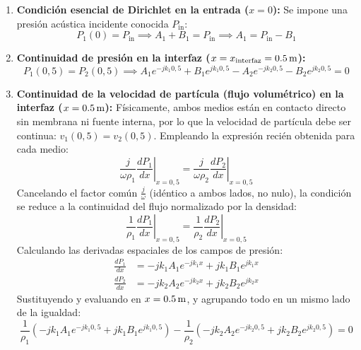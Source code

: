 \documentclass[11pt,letterpaper]{article}
\begin{document}
\begin{enumerate}
    \item \textbf{Condición esencial de Dirichlet en la entrada ($x = 0$):}
    Se impone una presión acústica incidente conocida $P_{\text{in}}$:
    \begin{equation}
        P_1(0) = P_{\text{in}} \implies A_1 + B_1 = P_{\text{in}} \implies A_1 = P_{\text{in}} - B_1
    \end{equation}

    \item \textbf{Continuidad de presión en la interfaz ($x = x_{\text{interfaz}} = \text{\qty{0,5}{\metre}}$):}
    \begin{equation}
        P_1(0{,}5) = P_2(0{,}5) \implies A_1 e^{-j k_1 0{,}5} + B_1 e^{j k_1 0{,}5} - A_2 e^{-j k_2 0{,}5} - B_2 e^{j k_2 0{,}5} = 0
    \end{equation}

    \item \textbf{Continuidad de la velocidad de partícula (flujo volumétrico) en la interfaz ($x = \text{\qty{0,5}{\metre}}$):}
    Físicamente, ambos medios están en contacto directo sin membrana ni fuente interna, por lo que la velocidad de partícula debe ser continua: $v_1(0{,}5) = v_2(0{,}5)$. Empleando la expresión recién obtenida para cada medio:
    \begin{equation}
        \frac{j}{\omega \rho_1} \left. \frac{dP_1}{dx} \right|_{x=0{,}5} = \frac{j}{\omega \rho_2} \left. \frac{dP_2}{dx} \right|_{x=0{,}5}
    \end{equation}
    Cancelando el factor común $\frac{j}{\omega}$ (idéntico a ambos lados, no nulo), la condición se reduce a la continuidad del flujo normalizado por la densidad:
    \begin{equation}
        \frac{1}{\rho_1} \left. \frac{dP_1}{dx} \right|_{x=0{,}5} = \frac{1}{\rho_2} \left. \frac{dP_2}{dx} \right|_{x=0{,}5}
    \end{equation}
    Calculando las derivadas espaciales de los campos de presión:
    \begin{align}
        \frac{dP_1}{dx} &= -j k_1 A_1 e^{-j k_1 x} + j k_1 B_1 e^{j k_1 x} \\
        \frac{dP_2}{dx} &= -j k_2 A_2 e^{-j k_2 x} + j k_2 B_2 e^{j k_2 x}
    \end{align}
    Sustituyendo y evaluando en $x = \text{\qty{0,5}{\metre}}$, y agrupando todo en un mismo lado de la igualdad:
    \begin{equation}
        \frac{1}{\rho_1} \left( -j k_1 A_1 e^{-j k_1 0{,}5} + j k_1 B_1 e^{j k_1 0{,}5} \right) - \frac{1}{\rho_2} \left( -j k_2 A_2 e^{-j k_2 0{,}5} + j k_2 B_2 e^{j k_2 0{,}5} \right) = 0
    \end{equation}
\end{enumerate}
\end{document}
